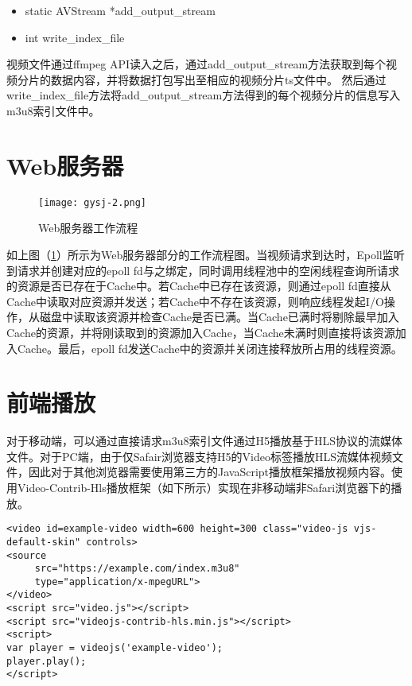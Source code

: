 \documentclass[bachelor]{thesis-uestc}
\begin{document}
\begin{itemize}
	\item static AVStream *add\_output\_stream
	\item int write\_index\_file
\end{itemize}

视频文件通过ffmpeg API读入之后，通过add\_output\_stream方法获取到每个视频分片的数据内容，并将数据打包写出至相应的视频分片ts文件中。 然后通过write\_index\_file方法将add\_output\_stream方法得到的每个视频分片的信息写入m3u8索引文件中。

\section{Web服务器}



\begin{figure}[h]
\texttt{[image: gysj-2.png]}
\caption{Web服务器工作流程}
\label{gysj-2} 
\end{figure}

如上图（\ref{gysj-2}）所示为Web服务器部分的工作流程图。当视频请求到达时，Epoll监听到请求并创建对应的epoll fd与之绑定，同时调用线程池中的空闲线程查询所请求的资源是否已存在于Cache中。若Cache中已存在该资源，则通过epoll fd直接从Cache中读取对应资源并发送；若Cache中不存在该资源，则响应线程发起I/O操作，从磁盘中读取该资源并检查Cache是否已满。当Cache已满时将剔除最早加入Cache的资源，并将刚读取到的资源加入Cache，当Cache未满时则直接将该资源加入Cache。最后，epoll fd发送Cache中的资源并关闭连接释放所占用的线程资源。

\section{前端播放}

对于移动端，可以通过直接请求m3u8索引文件通过H5播放基于HLS协议的流媒体文件。对于PC端，由于仅Safair浏览器支持H5的Video标签播放HLS流媒体视频文件，因此对于其他浏览器需要使用第三方的JavaScript播放框架播放视频内容。使用Video-Contrib-Hls播放框架（如下所示）实现在非移动端非Safari浏览器下的播放。


\begin{lstlisting}
<video id=example-video width=600 height=300 class="video-js vjs-default-skin" controls>
<source
     src="https://example.com/index.m3u8"
     type="application/x-mpegURL">
</video>
<script src="video.js"></script>
<script src="videojs-contrib-hls.min.js"></script>
<script>
var player = videojs('example-video');
player.play();
</script>
\end{lstlisting}
\end{document}
